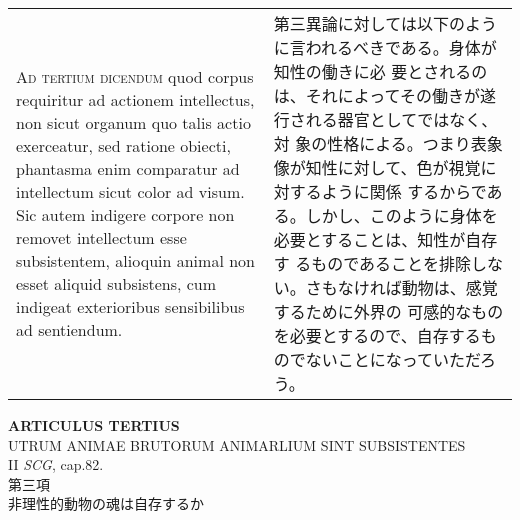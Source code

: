 \documentclass[paper=a4paper,fontsize=10pt,jafontsize=9pt,titlepage]{jlreq}
\begin{document}
\begin{longtable}{p{21em}p{21em}}
\\



{\scshape Ad tertium dicendum} quod corpus requiritur ad actionem
intellectus, non sicut organum quo talis actio exerceatur, sed ratione
obiecti, phantasma enim comparatur ad intellectum sicut color ad
visum. Sic autem indigere corpore non removet intellectum esse
subsistentem, alioquin animal non esset aliquid subsistens, cum
indigeat exterioribus sensibilibus ad sentiendum.


&

第三異論に対しては以下のように言われるべきである。身体が知性の働きに必
要とされるのは、それによってその働きが遂行される器官としてではなく、対
象の性格による。つまり表象像が知性に対して、色が視覚に対するように関係
するからである。しかし、このように身体を必要とすることは、知性が自存す
るものであることを排除しない。さもなければ動物は、感覚するために外界の
可感的なものを必要とするので、自存するものでないことになっていただろう。

\\


\end{longtable}
\newpage







\begin{center}
{\Large {\bfseries ARTICULUS TERTIUS}}\\
{\large UTRUM ANIMAE BRUTORUM ANIMARLIUM SINT SUBSISTENTES}\\
{\footnotesize II {\itshape SCG}, cap.82.}\\
{\Large 第三項\\非理性的動物の魂は自存するか}
\end{center}
\end{document}
